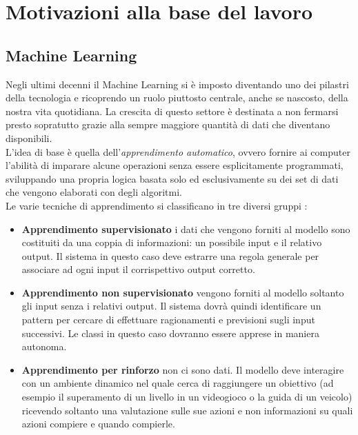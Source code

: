 \chapter{Motivazioni alla base del lavoro}\label{ch:capitolo1}
\section{Machine Learning}
Negli ultimi decenni il Machine Learning si è imposto diventando uno dei pilastri della tecnologia e ricoprendo un ruolo piuttosto centrale, anche se nascosto, della nostra vita quotidiana. La crescita di questo settore è destinata a non fermarsi presto sopratutto grazie alla sempre maggiore quantità di dati che diventano disponibili.\\
L'idea di base è quella dell'\textit{apprendimento automatico}, ovvero fornire ai computer l'abilità di imparare alcune operazioni senza essere esplicitamente programmati, sviluppando una propria logica basata solo ed esclusivamente su dei set di dati che vengono elaborati con degli algoritmi. \\
Le varie tecniche di apprendimento si classificano in tre diversi gruppi \cite{AI}:
\begin{itemize}
	\item \textbf{Apprendimento supervisionato} i dati che vengono forniti al modello sono costituiti da una coppia di informazioni: un possibile input e il relativo output. Il sistema in questo caso deve estrarre una regola generale per associare ad ogni input il corrispettivo output corretto.
	\item \textbf{Apprendimento non supervisionato} vengono forniti al modello soltanto gli input senza i relativi output. Il sistema dovrà quindi identificare un pattern per cercare di effettuare ragionamenti e previsioni sugli input successivi. Le classi in questo caso dovranno essere apprese in maniera autonoma. 
	\item \textbf{Apprendimento per rinforzo} non ci sono dati. Il modello deve interagire con un ambiente dinamico nel quale cerca di raggiungere un obiettivo (ad esempio il superamento di un livello in un videogioco o la guida di un veicolo) ricevendo soltanto una valutazione sulle sue azioni e non informazioni su quali azioni compiere e quando compierle.
\end{itemize}
